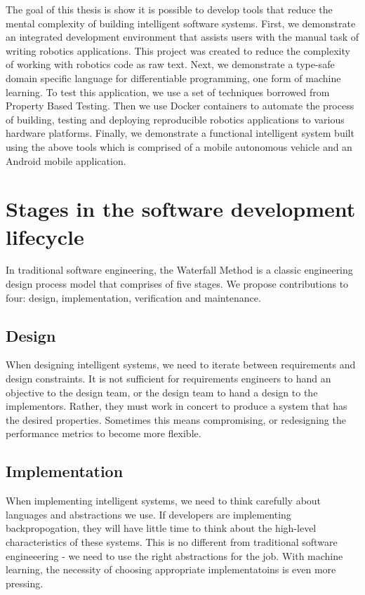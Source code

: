 \documentclass[12pt,initial,twoside,maitrise]{dms}
\numberwithin{equation}{section}
\numberwithin{table}{chapter}
\numberwithin{figure}{chapter}
\begin{document}
The goal of this thesis is show it is possible to develop tools that reduce the mental complexity of building intelligent software systems. First, we demonstrate an integrated development environment that assists users with the manual task of writing robotics applications. This project was created to reduce the complexity of working with robotics code as raw text. Next, we demonstrate a type-safe domain specific language for differentiable programming, one form of machine learning. To test this application, we use a set of techniques borrowed from Property Based Testing. Then we use Docker containers to automate the process of building, testing and deploying reproducible robotics applications to various hardware platforms. Finally, we demonstrate a functional intelligent system built using the above tools which is comprised of a mobile autonomous vehicle and an Android mobile application.

\section{Stages in the software development lifecycle}

In traditional software engineering, the Waterfall Method is a classic engineering design process model that comprises of five stages. We propose contributions to four: design, implementation, verification and maintenance.

\subsection{Design}

When designing intelligent systems, we need to iterate between requirements and design constraints. It is not sufficient for requirements engineers to hand an objective to the design team, or the design team to hand a design to the implementors. Rather, they must work in concert to produce a system that has the desired properties. Sometimes this means compromising, or redesigning the performance metrics to become more flexible.

\subsection{Implementation}

When implementing intelligent systems, we need to think carefully about languages and abstractions we use. If developers are implementing backpropogation, they will have little time to think about the high-level characteristics of these systems. This is no different from traditional software engineeering - we need to use the right abstractions for the job. With machine learning, the necessity of choosing appropriate implementatoins is even more pressing.
\end{document}
